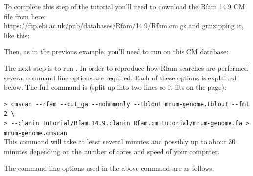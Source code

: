 To complete this step of the tutorial you'll need to download the Rfam
14.9 CM file from here: \\
\url{https://ftp.ebi.ac.uk/pub/databases/Rfam/14.9/Rfam.cm.gz}
and gunzipping it, like this: 



Then, as in the previous example, you'll need to run  on
this CM database:


The next step is to run . In order to reproduce how Rfam
searches are performed \citep{Nawrocki15} several command line
options are required. Each of these options is explained below. The
full command is (split up into two lines so it fits on the page): 

\indent\indent\small\verb+> cmscan --rfam --cut_ga --nohmmonly --tblout mrum-genome.tblout --fmt 2 \+\\
\indent\indent\small\verb+> --clanin tutorial/Rfam.14.9.clanin Rfam.cm tutorial/mrum-genome.fa > mrum-genome.cmscan+\\

This command will take at least several minutes and possibly up to
about 30 minutes depending on the number of cores and speed of your
computer. 

The command line options used in the above command are as follows:

